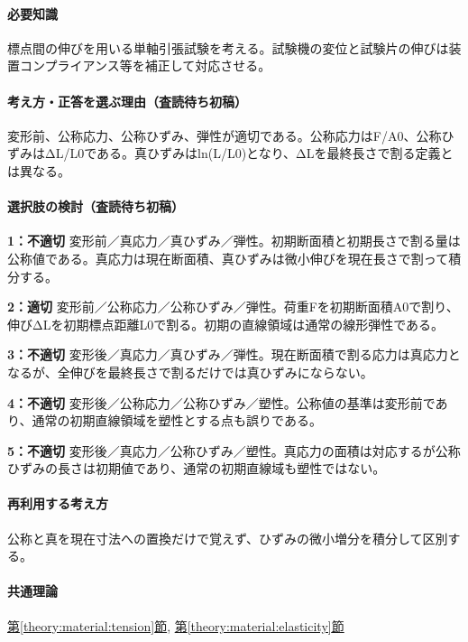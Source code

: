 \paragraph{必要知識} 標点間の伸びを用いる単軸引張試験を考える。試験機の変位と試験片の伸びは装置コンプライアンス等を補正して対応させる。

\paragraph{考え方・正答を選ぶ理由（査読待ち初稿）} 変形前、公称応力、公称ひずみ、弾性が適切である。公称応力はF/A0、公称ひずみはΔL/L0である。真ひずみはln(L/L0)となり、ΔLを最終長さで割る定義とは異なる。

\paragraph{選択肢の検討（査読待ち初稿）}\mbox{}\par

\noindent\textbf{1：不適切} 変形前／真応力／真ひずみ／弾性。初期断面積と初期長さで割る量は公称値である。真応力は現在断面積、真ひずみは微小伸びを現在長さで割って積分する。\par

\noindent\textbf{2：適切} 変形前／公称応力／公称ひずみ／弾性。荷重Fを初期断面積A0で割り、伸びΔLを初期標点距離L0で割る。初期の直線領域は通常の線形弾性である。\par

\noindent\textbf{3：不適切} 変形後／真応力／真ひずみ／弾性。現在断面積で割る応力は真応力となるが、全伸びを最終長さで割るだけでは真ひずみにならない。\par

\noindent\textbf{4：不適切} 変形後／公称応力／公称ひずみ／塑性。公称値の基準は変形前であり、通常の初期直線領域を塑性とする点も誤りである。\par

\noindent\textbf{5：不適切} 変形後／真応力／公称ひずみ／塑性。真応力の面積は対応するが公称ひずみの長さは初期値であり、通常の初期直線域も塑性ではない。\par

\paragraph{再利用する考え方} 公称と真を現在寸法への置換だけで覚えず、ひずみの微小増分を積分して区別する。

\paragraph{共通理論} \hyperref[theory:material:tension]{第\ref*{theory:material:tension}節}, \hyperref[theory:material:elasticity]{第\ref*{theory:material:elasticity}節}

